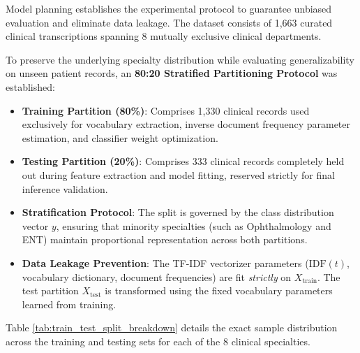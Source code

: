 Model planning establishes the experimental protocol to guarantee unbiased evaluation and eliminate data leakage. The dataset consists of 1,663 curated clinical transcriptions spanning 8 mutually exclusive clinical departments.

To preserve the underlying specialty distribution while evaluating generalizability on unseen patient records, an \textbf{80:20 Stratified Partitioning Protocol} was established:
\begin{itemize}
    \item \textbf{Training Partition (80\%)}: Comprises 1,330 clinical records used exclusively for vocabulary extraction, inverse document frequency parameter estimation, and classifier weight optimization.
    \item \textbf{Testing Partition (20\%)}: Comprises 333 clinical records completely held out during feature extraction and model fitting, reserved strictly for final inference validation.
    \item \textbf{Stratification Protocol}: The split is governed by the class distribution vector $y$, ensuring that minority specialties (such as Ophthalmology and ENT) maintain proportional representation across both partitions.
    \item \textbf{Data Leakage Prevention}: The TF-IDF vectorizer parameters ($\text{IDF}(t)$, vocabulary dictionary, document frequencies) are fit \textit{strictly} on $X_{\text{train}}$. The test partition $X_{\text{test}}$ is transformed using the fixed vocabulary parameters learned from training.
\end{itemize}

Table \ref{tab:train_test_split_breakdown} details the exact sample distribution across the training and testing sets for each of the 8 clinical specialties.


